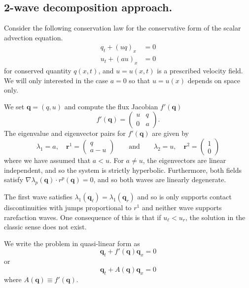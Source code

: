 \documentclass{article}
\begin{document}
\subsection{2-wave decomposition approach.}
Consider the following conservation law for the conservative form of the scalar advection equation.
\begin{align}
q_t + (uq)_x &= 0 \\
u_t + (au)_x & = 0
\end{align}
for conserved quantity $q(x,t)$, and  $u = u(x,t)$ is a prescribed velocity field.  We will only 
interested in the case $a = 0$ so that $u = u(x)$ depends on space only.

We set $\mathbf q = (q,u)$ and compute the flux Jacobian $f'(\mathbf q)$
\begin{equation}
f'(\mathbf q) = \left(\begin{array}{rr} u & q \\ 0 & a\end{array}\right).
\end{equation}
The eigenvalue and eigenvector pairs for $f'(\mathbf q)$ are given by
\begin{equation}
\lambda_1 = a,  \quad  {\mathbf r}^1 = \left(\begin{array}{c} q \\ a-u\end{array}\right) \qquad \mbox{and} \qquad
\lambda_2 = u,  \quad  {\mathbf r}^2 = \left(\begin{array}{c} 1 \\ 0\end{array}\right)
\end{equation}
where we have assumed that $a < u$.  For $a \ne u$, the eigenvectors are linear independent, and so the system is strictly hyperbolic.  Furthermore, both fields satisfy $\nabla \lambda_p(\mathbf q) \cdot r^p(\mathbf q) = 0$, and so both waves are linearly degenerate.  

The first wave satisfies $\lambda_1(\mathbf q_\ell) = \lambda_1(\mathbf q_r)$ and so is only supports contact discontinuities with jumps proportional to $r^1$ and neither wave supports rarefaction
waves.  One consequence of this is that if $u_\ell < u_r$, the solution in the classic sense does not exist. 

We write the problem in quasi-linear form as 
\begin{equation}
\mathbf q_t + f'(\mathbf q) \mathbf q_x = 0
\end{equation}
or
\begin{equation}
\mathbf q_t + A(\mathbf q) \mathbf q_x = 0
\end{equation}
where $A(\mathbf q) \equiv f'(\mathbf q)$.  
\end{document}

